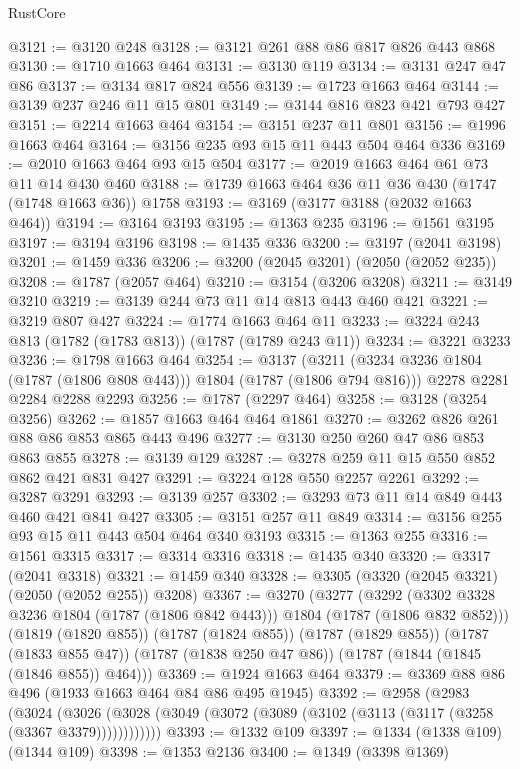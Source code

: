 \begin{lexlean}{RustCore}
\begin{coremodule}
@3121 := @3120 @248
@3128 := @3121 @261 @88 @86 @817 @826 @443 @868
@3130 := @1710 @1663 @464
@3131 := @3130 @119
@3134 := @3131 @247 @47 @86
@3137 := @3134 @817 @824 @556
@3139 := @1723 @1663 @464
@3144 := @3139 @237 @246 @11 @15 @801
@3149 := @3144 @816 @823 @421 @793 @427
@3151 := @2214 @1663 @464
@3154 := @3151 @237 @11 @801
@3156 := @1996 @1663 @464
@3164 := @3156 @235 @93 @15 @11 @443 @504 @464 @336
@3169 := @2010 @1663 @464 @93 @15 @504
@3177 := @2019 @1663 @464 @61 @73 @11 @14 @430 @460
@3188 := @1739 @1663 @464 @36 @11 @36 @430 (@1747 (@1748 @1663 @36)) @1758
@3193 := @3169 (@3177 @3188 (@2032 @1663 @464))
@3194 := @3164 @3193
@3195 := @1363 @235
@3196 := @1561 @3195
@3197 := @3194 @3196
@3198 := @1435 @336
@3200 := @3197 (@2041 @3198)
@3201 := @1459 @336
@3206 := @3200 (@2045 @3201) (@2050 (@2052 @235))
@3208 := @1787 (@2057 @464)
@3210 := @3154 (@3206 @3208)
@3211 := @3149 @3210
@3219 := @3139 @244 @73 @11 @14 @813 @443 @460 @421
@3221 := @3219 @807 @427
@3224 := @1774 @1663 @464 @11
@3233 := @3224 @243 @813 (@1782 (@1783 @813)) (@1787 (@1789 @243 @11))
@3234 := @3221 @3233
@3236 := @1798 @1663 @464
@3254 := @3137
    (@3211 (@3234 @3236 @1804 (@1787 (@1806 @808 @443))) @1804 (@1787 (@1806 @794 @816)))
    @2278
    @2281
    @2284
    @2288
    @2293
@3256 := @1787 (@2297 @464)
@3258 := @3128 (@3254 @3256)
@3262 := @1857 @1663 @464 @464 @1861
@3270 := @3262 @826 @261 @88 @86 @853 @865 @443 @496
@3277 := @3130 @250 @260 @47 @86 @853 @863 @855
@3278 := @3139 @129
@3287 := @3278 @259 @11 @15 @550 @852 @862 @421 @831 @427
@3291 := @3224 @128 @550 @2257 @2261
@3292 := @3287 @3291
@3293 := @3139 @257
@3302 := @3293 @73 @11 @14 @849 @443 @460 @421 @841 @427
@3305 := @3151 @257 @11 @849
@3314 := @3156 @255 @93 @15 @11 @443 @504 @464 @340 @3193
@3315 := @1363 @255
@3316 := @1561 @3315
@3317 := @3314 @3316
@3318 := @1435 @340
@3320 := @3317 (@2041 @3318)
@3321 := @1459 @340
@3328 := @3305 (@3320 (@2045 @3321) (@2050 (@2052 @255)) @3208)
@3367 := @3270
    (@3277
      (@3292 (@3302 @3328 @3236 @1804 (@1787 (@1806 @842 @443))) @1804 (@1787 (@1806 @832 @852)))
      (@1819 (@1820 @855))
      (@1787 (@1824 @855))
      (@1787 (@1829 @855))
      (@1787 (@1833 @855 @47))
      (@1787 (@1838 @250 @47 @86))
      (@1787 (@1844 (@1845 (@1846 @855)) @464)))
@3369 := @1924 @1663 @464
@3379 := @3369 @88 @86 @496 (@1933 @1663 @464 @84 @86 @495 @1945)
@3392 := @2958
    (@2983
      (@3024 (@3026 (@3028 (@3049 (@3072 (@3089 (@3102 (@3113 (@3117 (@3258 (@3367 @3379))))))))))))
@3393 := @1332 @109
@3397 := @1334 (@1338 @109) (@1344 @109)
@3398 := @1353 @2136
@3400 := @1349 (@3398 @1369)

\end{coremodule}
\end{lexlean}
